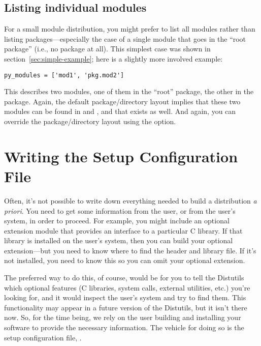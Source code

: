 \documentclass{howto}
\begin{document}
\subsection{Listing individual modules}
\label{sec:listing-modules}

For a small module distribution, you might prefer to list all modules
rather than listing packages---especially the case of a single module
that goes in the ``root package'' (i.e., no package at all).  This
simplest case was shown in section~\ref{sec:simple-example}; here is a
slightly more involved example:
\begin{verbatim}
py_modules = ['mod1', 'pkg.mod2']
\end{verbatim}
This describes two modules, one of them in the ``root'' package, the
other in the  package.  Again, the default
package/directory layout implies that these two modules can be found in
 and , and that 
exists as well.  And again, you can override the package/directory
layout using the  option.  


\section{Writing the Setup Configuration File}
\label{sec:setup-config}


Often, it's not possible to write down everything needed to build a
distribution \emph{a priori}.  You need to get some information from the
user, or from the user's system, in order to proceed.  For example, you
might include an optional extension module that provides an interface to
a particular C library.  If that library is installed on the user's
system, then you can build your optional extension---but you need to
know where to find the header and library file.  If it's not installed,
you need to know this so you can omit your optional extension.

The preferred way to do this, of course, would be for you to tell the
Distutils which optional features (C libraries, system calls, external
utilities, etc.) you're looking for, and it would inspect the user's
system and try to find them.  This functionality may appear in a future
version of the Distutils, but it isn't there now.  So, for the time
being, we rely on the user building and installing your software to
provide the necessary information.  The vehicle for doing so is the
setup configuration file, .
\end{document}
